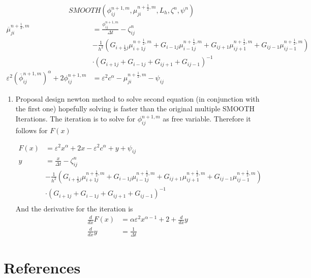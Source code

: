 \documentclass[11pt]{article}
\begin{document}
\begin{align*}
SMOOTH( \phi^{n+1,m}_{ij}, \mu^{n + \frac{1}{2},m}_{ji}, L_h , \zeta ^n , \psi ^n )
\end{align*}
\begin{align*}
\overline{\mu}^{n + \frac{1}{2},m}_{ji}
&=
  \frac{\phi ^{n+1,m}_{ij}}{\Delta t} - \zeta^n_{ij} \\
&- \frac{1}{h^2}(G_{i+\frac{1}{2}j} \mu^{n + \frac{1}{2},m}_{i+1j} +  G_{i-1j} \mu^{n + \frac{1}{2},m}_{i-1j} + G_{ij+1}  \mu^{n + \frac{1}{2},m}_{ij+1} + G_{ij-1} \mu^{n + \frac{1}{2},m}_{ij-1}) \\
&\cdot  (G_{i+1j} + G_{i-1j} + G_{ij+1} + G_{ij-1})^{-1} \\
 \varepsilon ^2 (\overline{\phi} ^{n+1,m}_{ij})^\alpha + 2 \phi ^{n+1,m}_{ij} &= \varepsilon ^2 c^\alpha  -\mu^{n + \frac{1}{2},m}_{ji}  - \psi_{ij}
\end{align*}
\begin{enumerate}
\item Proposal
\label{sec:org74d78e3}
design newton method to solve second equation (in conjunction with the first one) hopefully solving is faster than the original multiple SMOOTH Iterations.
 The iteration is to solve for \(\phi ^{n+1,m}_{ij}\) as free variable. Therefore it follows for \(F(x)\)

\begin{align*}
F(x)  &= \varepsilon ^2 x^\alpha + 2x - \varepsilon^2 c^\alpha  + y + \psi_{ij} \\
y &= \frac{x}{\Delta t} - \zeta^n_{ij} \\
&- \frac{1}{h^2}(G_{i+\frac{1}{2}j} \mu^{n + \frac{1}{2},m}_{i+1j} +  G_{i-1j} \mu^{n + \frac{1}{2},m}_{i-1j} + G_{ij+1}  \mu^{n + \frac{1}{2},m}_{ij+1} + G_{ij-1} \mu^{n + \frac{1}{2},m}_{ij-1}) \\
&\cdot  (G_{i+1j} + G_{i-1j} + G_{ij+1} + G_{ij-1})^{-1} \\
\end{align*}
And the derivative for the iteration is
\begin{align*}
\frac{d}{dx} F(x)&= \alpha \varepsilon^2 x^{\alpha-1} + 2 + \frac{d}{dx} y  \\
\frac{d}{dx} y  &= \frac{1}{\Delta t}
\end{align*}
\end{enumerate}
\section{References}
\label{sec:org64da61e}
\printbibliography
\end{document}

